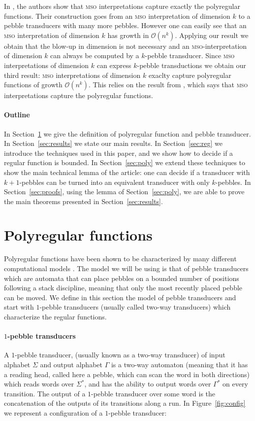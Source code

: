 \documentclass[sigplan,review,anonymous]{acmart}\settopmatter{printfolios=true,printccs=false,printacmref=false}
\newcommand{\Oo}{\mathcal O}
\newcommand{\mso}{\textsc{mso}\xspace}
\theoremstyle{definition}
\theoremstyle{remark}
\begin{document}
In \cite{BojanczykKL19}, the authors show that \mso interpretations capture exactly the polyregular functions. Their construction goes from an \mso interpretation of dimension $k$ to a pebble transducers with many more pebbles. However one can easily see that an \mso interpretation of dimension $k$ has growth in $\Oo(n^k)$. Applying our result we obtain that the blow-up in dimension is not necessary and an \mso-interpretation of dimension $k$ can always be computed by a $k$-pebble transducer. Since \mso interpretations of dimension $k$ can express $k$-pebble transductions we obtain our third result: \mso interpretations of dimension $k$ exaclty capture polyregular functions of growth $\Oo(n^k)$. This relies on the result from \cite{BojanczykKL19}, which says that \mso interpretations capture the polyregular functions.


\paragraph*{Outline}
In Section~\ref{sec:defs} we give the definition of polyregular function and pebble transducer. In Section~\ref{sec:results} we state our main results. In Section~\ref{sec:reg} we introduce the techniques used in this paper, and we show how to decide if a regular function is bounded.
In Section~\ref{sec:poly} we extend these techniques to show the main technical lemma of the article: one can decide if a transducer with $k+1$-pebbles can be turned into an equivalent  transducer with only $k$-pebbles.
In Section~\ref{sec:proofs}, using the lemma of Section~\ref{sec:poly}, we are able to prove the main theorems presented in Section~\ref{sec:results}.

\section{Polyregular functions}
\label{sec:defs}

Polyregular functions have been shown to be characterized by many different computational models \cite{Bojanczyk18,BojanczykKL19}. The model we will be using is that of pebble transducers which are automata that can place pebbles on a bounded number of positions following a stack discipline, meaning that only the most recently placed pebble can be moved.
We define in this section the model of pebble transducers and start with $1$-pebble transducers (usually called two-way transducers) which characterize the regular functions.

\paragraph{$1$-pebble transducers}
A $1$-pebble transducer, (usually known as a two-way transducer) of input alphabet $\Sigma$ and output alphabet $\Gamma$ is a two-way automaton (meaning that it has a reading head, called here a pebble, which can scan the word in both directions) which reads words over $\Sigma^*$, and has the ability to output words over $\Gamma^*$ on every transition. 
The output of a $1$-pebble transducer over some word is the concatenation of the outputs of its transitions along a run.
In Figure~\ref{fig:config} we represent a configuration of a $1$-pebble transducer:
\end{document}
